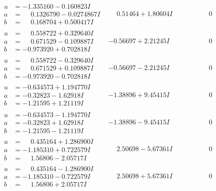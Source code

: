 \documentclass[1p]{elsarticle_modified}
\theoremstyle{definition}
\begin{document}
$$\begin{array}{c|c|c}
\begin{aligned}
u &= -1.335160 - 0.160823 I \\
a &= \phantom{-}0.1326790 - 0.0274867 I \\
b &= \phantom{-}0.168704 + 0.500417 I\end{aligned}
 & \phantom{-}0.51464 + 1.80604 I & \phantom{-0.000000 } 0 \\ \hline\begin{aligned}
u &= \phantom{-}0.558722 + 0.329640 I \\
a &= \phantom{-}0.671529 - 0.109887 I \\
b &= -0.973920 + 0.702818 I\end{aligned}
 & -0.56697 + 2.21245 I & \phantom{-0.000000 } 0 \\ \hline\begin{aligned}
u &= \phantom{-}0.558722 - 0.329640 I \\
a &= \phantom{-}0.671529 + 0.109887 I \\
b &= -0.973920 - 0.702818 I\end{aligned}
 & -0.56697 - 2.21245 I & \phantom{-0.000000 } 0 \\ \hline\begin{aligned}
u &= -0.634573 + 1.194770 I \\
a &= -0.32823 - 1.62918 I \\
b &= -1.21595 + 1.21119 I\end{aligned}
 & -1.38896 + 9.45415 I & \phantom{-0.000000 } 0 \\ \hline\begin{aligned}
u &= -0.634573 - 1.194770 I \\
a &= -0.32823 + 1.62918 I \\
b &= -1.21595 - 1.21119 I\end{aligned}
 & -1.38896 - 9.45415 I & \phantom{-0.000000 } 0 \\ \hline\begin{aligned}
u &= \phantom{-}0.435164 + 1.286900 I \\
a &= -1.185310 + 0.722579 I \\
b &= \phantom{-}1.56806 - 2.05717 I\end{aligned}
 & \phantom{-}2.50698 - 5.67361 I & \phantom{-0.000000 } 0 \\ \hline\begin{aligned}
u &= \phantom{-}0.435164 - 1.286900 I \\
a &= -1.185310 - 0.722579 I \\
b &= \phantom{-}1.56806 + 2.05717 I\end{aligned}
 & \phantom{-}2.50698 + 5.67361 I & \phantom{-0.000000 } 0 \\ \hline\begin{aligned}

\end{aligned}
\end{array}$$
\end{document}
